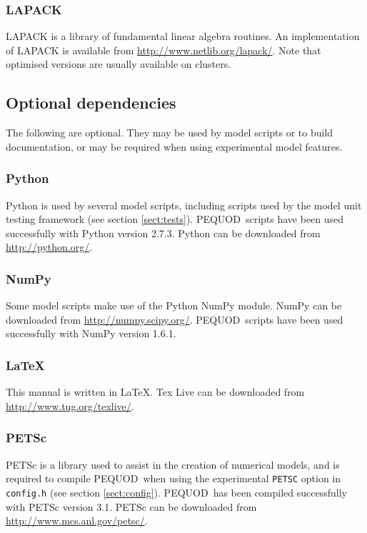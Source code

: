\documentclass[a4paper]{book}
\newcommand{\pequod}{PEQUOD}
\begin{document}
\subsubsection*{LAPACK}

LAPACK is a library of fundamental linear algebra routines. An implementation of
LAPACK is available from \url{http://www.netlib.org/lapack/}. Note that
optimised versions are usually available on clusters.

\subsection{Optional dependencies}\label{sect:optional_dependencies}

The following are optional. They may be used by model scripts or to build
documentation, or may be required when using experimental model features.

\subsubsection*{Python}

Python is used by several model scripts, including scripts used by the model
unit testing framework (see section \ref{sect:tests}). \pequod\ scripts have
been used successfully with Python version 2.7.3. Python can be
downloaded from \url{http://python.org/}.

\subsubsection*{NumPy}

Some model scripts make use of the Python NumPy module. NumPy can be downloaded
from \url{http://numpy.scipy.org/}. \pequod\ scripts have been used successfully
with NumPy version 1.6.1.

\subsubsection*{\LaTeX}

This manual is written in \LaTeX. Tex Live can be downloaded from
\url{http://www.tug.org/texlive/}.

\subsubsection*{PETSc}

PETSc is a library used to assist in the creation of numerical models, and is
required to compile \pequod\ when using the experimental \verb+PETSC+ option in
\verb+config.h+ (see section \ref{sect:config}). \pequod\ has been compiled
successfully with PETSc version 3.1. PETSc can be downloaded from
\url{http://www.mcs.anl.gov/petsc/}.
\end{document}
